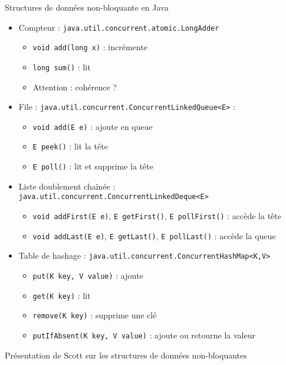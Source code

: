 \begin{frame}{Structures de données non-bloquante en Java}
  \begin{itemize}
  \item Compteur : \lstinline{java.util.concurrent.atomic.LongAdder}
    \begin{itemize}
    \item \lstinline{void add(long x)} : incrémente
    \item \lstinline{long sum()} : lit
    \item \alert{Attention : cohérence ?}
    \end{itemize}
  \item File : \lstinline{java.util.concurrent.ConcurrentLinkedQueue<E>} :
    \begin{itemize}
    \item \lstinline{void add(E e)} : ajoute en queue
    \item \lstinline{E peek()} : lit la tête
    \item \lstinline{E poll()} : lit et supprime la tête
    \end{itemize}
  \item Liste doublement chaînée : \lstinline{java.util.concurrent.ConcurrentLinkedDeque<E>}
    \begin{itemize}
    \item \lstinline{void addFirst(E e)}, \lstinline{E getFirst()}, \lstinline{E pollFirst()} : accède la tête
    \item \lstinline{void addLast(E e)}, \lstinline{E getLast()}, \lstinline{E pollLast()} : accède la queue
    \end{itemize}
  \item Table de hashage : \lstinline{java.util.concurrent.ConcurrentHashMap<K,V>}
    \begin{itemize}
    \item \lstinline{put(K key, V value)} : ajoute
    \item \lstinline{get(K key)} : lit
    \item \lstinline{remove(K key)} : supprime une clé
    \item \lstinline{putIfAbsent(K key, V value)} : ajoute ou retourne la valeur
    \end{itemize}
  \end{itemize}
  \begin{citing}
  \item Présentation de Scott sur les structures de données non-bloquantes
  \end{citing}
\end{frame}




